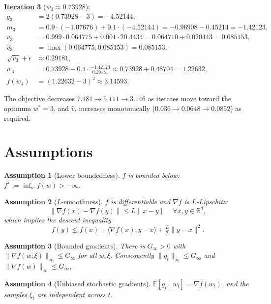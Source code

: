 \documentclass[11pt]{article}
\newtheorem{assumption}{Assumption}
\begin{document}
\textbf{Iteration 3} ($w_3 \approx 0.73928$):
\begin{align*}
g_3 &= 2(0.73928-3) = -4.52144,\\
m_3 &= 0.9\cdot(-1.07676) + 0.1\cdot(-4.52144) = -0.96908 - 0.45214 = -1.42123,\\
v_3 &= 0.999\cdot 0.064775 + 0.001\cdot 20.4434 = 0.064710 + 0.020443 = 0.085153,\\
\hat v_3 &= \max(0.064775, 0.085153) = 0.085153,\\
\sqrt{\hat v_3}+\epsilon &\approx 0.29181,\\
w_4 &= 0.73928 - 0.1\cdot\frac{-1.42123}{0.29181} \approx 0.73928 + 0.48704 = 1.22632,\\
f(w_4) &= (1.22632-3)^2 \approx 3.14593.
\end{align*}

The objective decreases $7.181 \to 5.111 \to 3.146$ as iterates move toward
the optimum $w^*=3$, and $\hat v_t$ increases monotonically
($0.036 \to 0.0648 \to 0.0852$) as required.

\section*{Assumptions}

\begin{assumption}[Lower boundedness]\label{a:lb}
$f$ is bounded below: $f^\star := \inf_w f(w) > -\infty$.
\end{assumption}

\begin{assumption}[$L$-smoothness]\label{a:smooth}
$f$ is differentiable and $\nabla f$ is $L$-Lipschitz:
\[
\|\nabla f(x)-\nabla f(y)\| \le L\|x-y\| \quad \forall x,y\in\mathbb{R}^d,
\]
which implies the descent inequality
\[
f(y) \le f(x) + \langle \nabla f(x), y-x\rangle + \tfrac{L}{2}\|y-x\|^2 .
\]
\end{assumption}

\begin{assumption}[Bounded gradients]\label{a:bg}
There is $G_\infty>0$ with $\|\nabla f(w;\xi)\|_\infty \le G_\infty$ for all
$w,\xi$. Consequently $\|g_t\|_\infty\le G_\infty$ and
$\|\nabla f(w)\|_\infty \le G_\infty$.
\end{assumption}

\begin{assumption}[Unbiased stochastic gradients]\label{a:unbias}
$\mathbb{E}[g_t \mid w_t] = \nabla f(w_t)$, and the samples $\xi_t$ are
independent across $t$.
\end{assumption}
\end{document}
